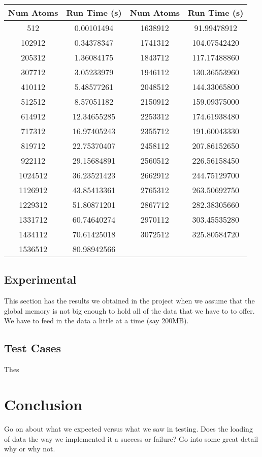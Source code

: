 \documentclass[twocolumn]{article}
\begin{document}
\begin{center}
\begin{tabular}{ |c|c|c|c| } 
\hline
Num Atoms & Run Time (s) & Num Atoms & Run Time (s) \\
\hline\hline 
512	& 0.00101494 & 1638912 & 91.99478912 \\
\hline
102912 & 0.34378347 & 1741312 & 104.07542420 \\
\hline
205312 & 1.36084175 & 1843712 & 117.17488860 \\
\hline
307712 & 3.05233979 & 1946112 & 130.36553960 \\
\hline
410112 & 5.48577261 & 2048512 & 144.33065800 \\
\hline
512512 & 8.57051182 & 2150912 & 159.09375000 \\
\hline
614912 & 12.34655285 & 2253312 & 174.61938480 \\
\hline
717312 & 16.97405243 & 2355712 & 191.60043330 \\
\hline
819712 & 22.75370407 & 2458112 & 207.86152650 \\
\hline
922112 & 29.15684891 & 2560512 & 226.56158450 \\
\hline
1024512 & 36.23521423 & 2662912 & 244.75129700 \\
\hline
1126912 & 43.85413361 & 2765312 & 263.50692750 \\
\hline
1229312 & 51.80871201 & 2867712 & 282.38305660 \\
\hline
1331712 & 60.74640274 & 2970112 & 303.45535280 \\
\hline
1434112 & 70.61425018 & 3072512 & 325.80584720 \\
\hline
1536512 & 80.98942566 & & \\
\hline
\end{tabular}

\end{center}

\subsection{Experimental}
This section has the results we obtained in the project when we assume that the global memory is not big enough to hold all of the data that we have to to offer. We have to feed in the data a little at a time (say 200MB).

\subsection{Test Cases}
Thes


\section{Conclusion}
Go on about what we expected versus what we saw in testing. Does the loading of data the way we implemented it a success or failure? Go into some great detail why or why not.








\end{document}
